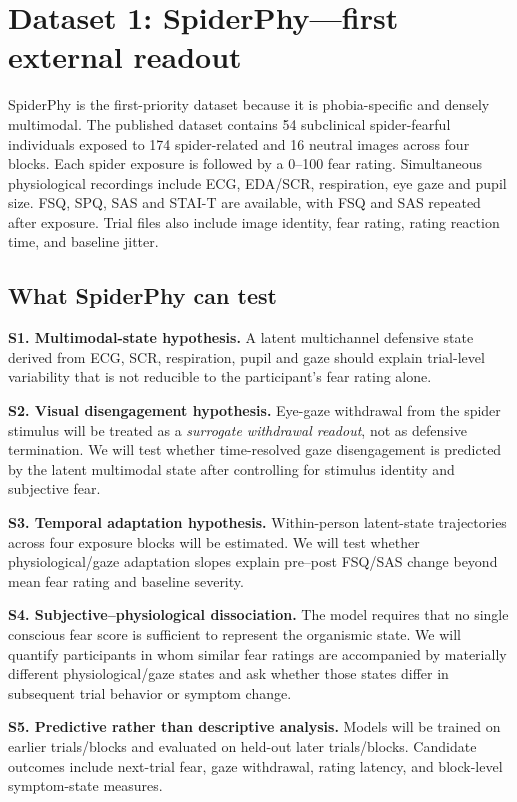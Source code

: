 \documentclass[11pt]{article}
\begin{document}
\section{Dataset 1: SpiderPhy---first external readout}

SpiderPhy is the first-priority dataset because it is phobia-specific and densely multimodal. The published dataset contains 54 subclinical spider-fearful individuals exposed to 174 spider-related and 16 neutral images across four blocks. Each spider exposure is followed by a 0--100 fear rating. Simultaneous physiological recordings include ECG, EDA/SCR, respiration, eye gaze and pupil size. FSQ, SPQ, SAS and STAI-T are available, with FSQ and SAS repeated after exposure. Trial files also include image identity, fear rating, rating reaction time, and baseline jitter.

\subsection{What SpiderPhy can test}

\textbf{S1. Multimodal-state hypothesis.} A latent multichannel defensive state derived from ECG, SCR, respiration, pupil and gaze should explain trial-level variability that is not reducible to the participant's fear rating alone.

\textbf{S2. Visual disengagement hypothesis.} Eye-gaze withdrawal from the spider stimulus will be treated as a \emph{surrogate withdrawal readout}, not as defensive termination. We will test whether time-resolved gaze disengagement is predicted by the latent multimodal state after controlling for stimulus identity and subjective fear.

\textbf{S3. Temporal adaptation hypothesis.} Within-person latent-state trajectories across four exposure blocks will be estimated. We will test whether physiological/gaze adaptation slopes explain pre--post FSQ/SAS change beyond mean fear rating and baseline severity.

\textbf{S4. Subjective--physiological dissociation.} The model requires that no single conscious fear score is sufficient to represent the organismic state. We will quantify participants in whom similar fear ratings are accompanied by materially different physiological/gaze states and ask whether those states differ in subsequent trial behavior or symptom change.

\textbf{S5. Predictive rather than descriptive analysis.} Models will be trained on earlier trials/blocks and evaluated on held-out later trials/blocks. Candidate outcomes include next-trial fear, gaze withdrawal, rating latency, and block-level symptom-state measures.
\end{document}
